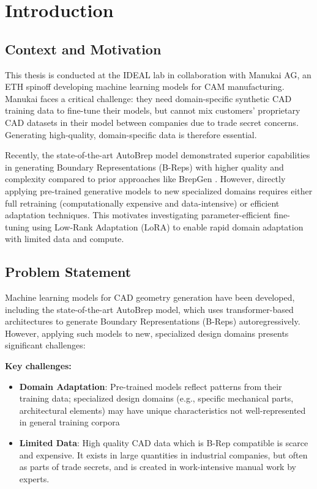 \section{Introduction}
\label{chap:introduction}

\subsection{Context and Motivation}

This thesis is conducted at the IDEAL lab in collaboration with Manukai AG, an ETH spinoff developing machine learning models for CAM manufacturing. Manukai faces a critical challenge: they need domain-specific synthetic CAD training data to fine-tune their models, but cannot mix customers' proprietary CAD datasets in their model between companies due to trade secret concerns. Generating high-quality, domain-specific data is therefore essential.

Recently, the state-of-the-art AutoBrep model \cite{Xu2025autobrep} demonstrated superior capabilities in generating Boundary Representations (B-Reps) with higher quality and complexity compared to prior approaches like BrepGen \cite{Xu2024brepgen}. However, directly applying pre-trained generative models to new specialized domains requires either full retraining (computationally expensive and data-intensive) or efficient adaptation techniques. This motivates investigating parameter-efficient fine-tuning using Low-Rank Adaptation (LoRA) to enable rapid domain adaptation with limited data and compute.


\subsection{Problem Statement}

Machine learning models for CAD geometry generation have been developed, including the state-of-the-art AutoBrep model, which uses transformer-based architectures to generate Boundary Representations (B-Reps) autoregressively. However, applying such models to new, specialized design domains presents significant challenges:

\par

\textbf{Key challenges:}
\begin{itemize}
    \item \textbf{Domain Adaptation}: Pre-trained models reflect patterns from their training data; specialized design domains (e.g., specific mechanical parts, architectural elements) may have unique characteristics not well-represented in general training corpora
    \item \textbf{Limited Data}: High quality CAD data which is B-Rep compatible is scarce and expensive. It exists in large quantities in industrial companies, but often as parts of trade secrets, and is created in work-intensive manual work by experts.
\end{itemize}

